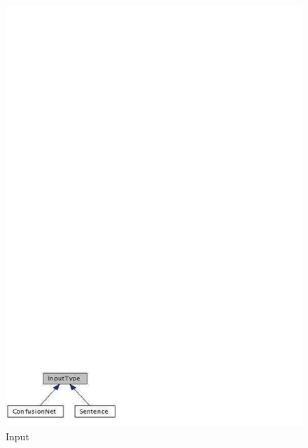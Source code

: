 \documentclass[11pt]{report}
\theoremstyle{plain}
\begin{document}
{\begin{center}
\begin{figure}[h]
\centering
\includegraphics[scale=1]{hieu-3}
\caption{Input}
\end{figure}
\end{center}

}
\end{document}
